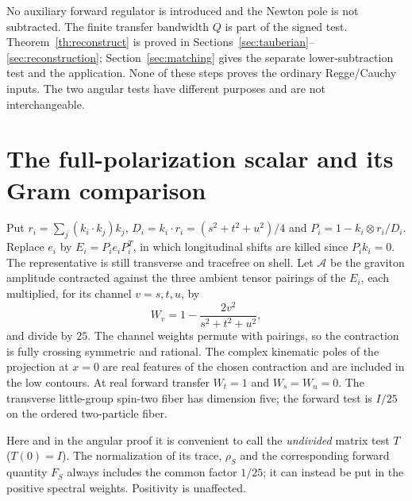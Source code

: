 \documentclass[11pt,a4paper]{article}
\theoremstyle{definition}
\theoremstyle{remark}
\begin{document}
No auxiliary forward regulator is introduced and the Newton pole is not subtracted. The finite transfer bandwidth \(Q\) is part of the signed test. Theorem~\ref{th:reconstruct} is proved in Sections~\ref{sec:tauberian}--\ref{sec:reconstruction}; Section~\ref{sec:matching} gives the separate lower-subtraction test and the application. None of these steps proves the ordinary Regge/Cauchy inputs. The two angular tests have different purposes and are not interchangeable.

\section{The full-polarization scalar and its Gram comparison}\label{sec:projection}
Put $r_i=\sum_j(k_i\cdot k_j)k_j$, $D_i=k_i\cdot r_i=(s^2+t^2+u^2)/4$ and $P_i=1-k_i\otimes r_i/D_i$. Replace $e_i$ by $E_i=P_i e_i P_i^T$, in which longitudinal shifts are killed since $P_i k_i=0$. The representative is still transverse and tracefree on shell. Let $\mathcal A$ be the graviton amplitude contracted against the three ambient tensor pairings of the $E_i$, each multiplied, for its channel $v=s,t,u$, by
\begin{equation}\label{eq:weight}
 W_v=1-\frac{2v^2}{s^2+t^2+u^2},
\end{equation}
and divide by $25$. The channel weights permute with pairings, so the contraction is fully crossing symmetric and rational. The complex kinematic poles of the projection at $x=0$ are real features of the chosen contraction and are included in the low contours. At real forward transfer $W_t=1$ and $W_s=W_u=0$. The transverse little-group spin-two fiber has dimension five; the forward test is $I/25$ on the ordered two-particle fiber.

Here and in the angular proof it is convenient to call the \emph{undivided} matrix test $T$ ($T(0)=I$). The normalization of its trace, $\rho_S$ and the corresponding forward quantity $F_S$ always includes the common factor $1/25$; it can instead be put in the positive spectral weights. Positivity is unaffected.
\end{document}

